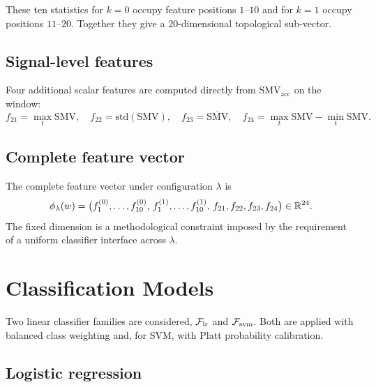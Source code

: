 These ten statistics for $k=0$ occupy feature positions $1$--$10$ and for $k=1$ occupy positions $11$--$20$. Together they give a 20-dimensional topological sub-vector.

\subsection{Signal-level features}
\label{subsubsec:signal-feats}

Four additional scalar features are computed directly from $\mathrm{SMV}_{\mathrm{acc}}$ on the window:
\begin{equation}
  f_{21}=\max_t\mathrm{SMV},\quad
  f_{22}=\mathrm{std}(\mathrm{SMV}),\quad
  f_{23}=\overline{\mathrm{SMV}},\quad
  f_{24}=\max_t\mathrm{SMV}-\min_t\mathrm{SMV}.
  \label{eq:sig-feats}
\end{equation}

\subsection{Complete feature vector}
\label{subsubsec:full-vec}

The complete feature vector under configuration $\lambda$ is
\begin{equation}
  \phi_\lambda(w)=\bigl(f_1^{(0)},\ldots,f_{10}^{(0)},\,f_1^{(1)},\ldots,f_{10}^{(1)},\,f_{21},f_{22},f_{23},f_{24}\bigr)\in\mathbb{R}^{24}.
  \label{eq:full-vec}
\end{equation}
The fixed dimension is a methodological constraint imposed by the requirement of a uniform classifier interface across $\lambda$.

\section{Classification Models}
\label{subsec:classifiers}

Two linear classifier families are considered, $\mathcal{F}_{\mathrm{lr}}$ and $\mathcal{F}_{\mathrm{svm}}$. Both are applied with balanced class weighting and, for SVM, with Platt probability calibration.

\subsection{Logistic regression}
\label{subsubsec:lr}

